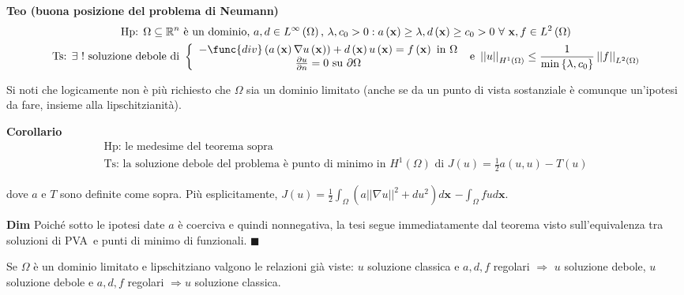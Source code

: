 \documentclass{article}
\begin{document}
\textbf{Teo (buona posizione del problema di Neumann)}%
\begin{gather*}
\text{Hp: }\Omega \subseteq 
\mathbb{R}
^{n}\text{ \`{e} un dominio, }a,d\in L^{\infty }\left( \Omega \right) \text{%
, }\lambda ,c_{0}>0:a\left( \mathbf{x}\right) \geq \lambda ,d\left( \mathbf{x%
}\right) \geq c_{0}>0\text{ }\forall \text{ }\mathbf{x},f\in L^{2}\left(
\Omega \right) \\
\text{Ts: }\exists \text{ }!\text{ soluzione debole di }\left\{ 
\begin{array}{c}
-\func{div}\left( a\left( \mathbf{x}\right) \nabla u\left( \mathbf{x}\right)
\right) +d\left( \mathbf{x}\right) u\left( \mathbf{x}\right) =f\left( 
\mathbf{x}\right) \text{ in }\Omega \\ 
\frac{\partial u}{\partial n}=0\text{ su }\partial \Omega%
\end{array}%
\right. \text{ e }\left\vert \left\vert u\right\vert \right\vert
_{H^{1}\left( \Omega \right) }\leq \frac{1}{\min \left\{ \lambda
,c_{0}\right\} }\left\vert \left\vert f\right\vert \right\vert _{L^{2}\left(
\Omega \right) }
\end{gather*}

Si noti che logicamente non \`{e} pi\`{u} richiesto che $\Omega $ sia un
dominio limitato (anche se da un punto di vista sostanziale \`{e} comunque
un'ipotesi da fare, insieme alla lipschitzianit\`{a}).

\textbf{Corollario}%
\begin{gather*}
\text{Hp: le medesime del teorema sopra} \\
\text{Ts: la soluzione debole del problema \`{e} punto di minimo in }%
H^{1}\left( \Omega \right) \text{ di }J\left( u\right) =\frac{1}{2}a\left(
u,u\right) -T\left( u\right)
\end{gather*}

dove $a$ e $T$ sono definite come sopra. Pi\`{u} esplicitamente, $J\left(
u\right) =\frac{1}{2}\int_{\Omega }\left( a\left\vert \left\vert \nabla
u\right\vert \right\vert ^{2}+du^{2}\right) d\mathbf{x}$ $-\int_{\Omega }fud%
\mathbf{x}$.

\textbf{Dim} Poich\'{e} sotto le ipotesi date $a$ \`{e} coerciva e quindi
nonnegativa, la tesi segue immediatamente dal teorema visto sull'equivalenza
tra soluzioni di PVA\ e punti di minimo di funzionali. $\blacksquare $

Se $\Omega $ \`{e} un dominio limitato e lipschitziano valgono le relazioni
gi\`{a} viste: $u$ soluzione classica e $a,d,f$ regolari $\Longrightarrow $ $%
u$ soluzione debole, $u$ soluzione debole e $a,d,f$ regolari $%
\Longrightarrow u$ soluzione classica. 
\end{document}
